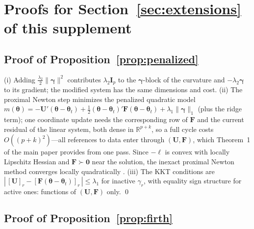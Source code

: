 \documentclass[11pt]{article}
\newcommand{\R}{\mathbb{R}}
\newcommand{\bgamma}{\bm{\gamma}}
\newcommand{\btheta}{\bm{\theta}}
\newcommand{\bF}{\mathbf{F}}
\newcommand{\bU}{\mathbf{U}}
\newcommand{\bI}{\mathbf{I}}
\newcommand{\bzero}{\mathbf{0}}
\begin{document}
\section{Proofs for Section~\ref{sec:extensions} of this supplement}\label{app:extensions}

\subsection{Proof of Proposition~\ref{prop:penalized}}

(i) Adding $\tfrac{\lambda_2}{2}\|\bgamma\|^2$ contributes $\lambda_2
\bI_p$ to the $\bgamma$-block of the curvature and $-\lambda_2\bgamma$
to its gradient; the modified system has the same dimensions and cost.
(ii) The proximal Newton step minimizes the penalized quadratic model
$m(\btheta) = -\bU'(\btheta - \btheta_t) + \tfrac12 (\btheta -
\btheta_t)'\bF(\btheta - \btheta_t) + \lambda_1\|\bgamma\|_1$ (plus the
ridge term); one coordinate update needs the corresponding row of $\bF$
and the current residual of the linear system, both dense in
$\R^{p+k}$, so a full cycle costs $O((p+k)^2)$---all references to data
enter through $(\bU, \bF)$, which Theorem~1 of the main paper provides from
one pass.  Since $-\ell$ is convex with locally Lipschitz Hessian and
$\bF \succ \bzero$ near the solution, the inexact proximal Newton method
converges locally quadratically \citep[Thms.~3.4--3.5]{leesun2014}.
(iii) The KKT conditions are $|\,[\bU]_r - [\bF(\btheta -
\btheta_t)]_r\,| \le \lambda_1$ for inactive $\gamma_r$, with equality
sign structure for active ones: functions of $(\bU, \bF)$ only. \qed

\subsection{Proof of Proposition~\ref{prop:firth}}
\end{document}
